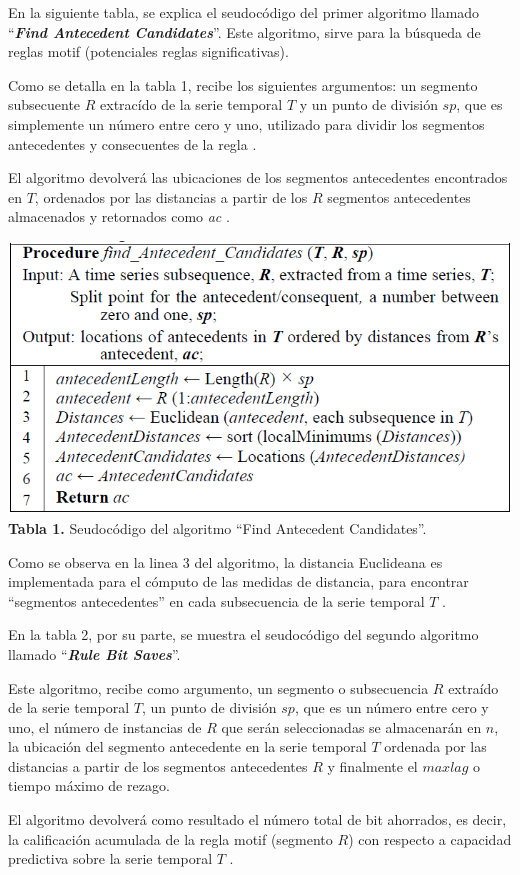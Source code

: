 En la siguiente tabla, se explica el seudoc\'odigo del primer algoritmo llamado \enquote{\textit{\textbf{Find Antecedent Candidates}}}. Este algoritmo, sirve para la b\'usqueda de reglas motif (potenciales reglas significativas).\par 
Como se detalla en la tabla 1, recibe los siguientes argumentos: un segmento subsecuente $R$ extrac\'ido de la serie temporal $T$ y un punto de divisi\'on $sp$, que es simplemente un n\'umero entre cero y uno, utilizado para dividir los segmentos antecedentes y consecuentes de la regla \cite{main}.\par
El algoritmo devolver\'a las ubicaciones de los segmentos antecedentes encontrados en $T$, ordenados por las distancias a partir de los $R$ segmentos antecedentes almacenados y retornados como \textit{ac} \cite{main}.
\begin{center}
\includegraphics[scale=0.7]{antecedent.png}\\
\vspace*{10pt}
\footnotesize{\textbf{Tabla 1.} Seudoc\'odigo del algoritmo \enquote{Find Antecedent Candidates}.}
\end{center}
Como se observa en la linea 3 del algoritmo, la distancia Euclideana es implementada para el c\'omputo de las medidas de distancia, para encontrar \enquote{segmentos antecedentes} en cada subsecuencia de la serie temporal $T$ \cite{main}.\par
En la tabla 2, por su parte, se muestra el seudoc\'odigo del segundo algoritmo llamado \enquote{\textit{\textbf{Rule Bit Saves}}}.\par 
Este algoritmo, recibe como argumento, un segmento o subsecuencia $R$ extra\'ido de la serie temporal $T$, un punto de divisi\'on $sp$, que es un n\'umero entre cero y uno, el n\'umero de instancias de $R$ que ser\'an seleccionadas se almacenar\'an en $n$, la ubicaci\'on del segmento antecedente en la serie temporal $T$ ordenada por las distancias a partir de los segmentos antecedentes $R$ y finalmente el $maxlag$ o tiempo m\'aximo de rezago.\par El algoritmo devolver\'a como resultado el n\'umero total de bit ahorrados, es decir, la calificaci\'on acumulada de la regla motif (segmento $R$) con respecto a capacidad predictiva sobre la serie temporal $T$ \cite{main}.\par
